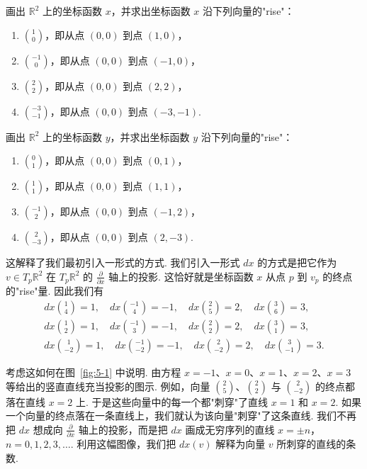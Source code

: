 \begin{question}\label{q:5-1}
画出 $\mathbb{R}^2$ 上的坐标函数 $x$，并求出坐标函数 $x$ 沿下列向量的"rise"：
\begin{enumerate}
  \item[(a)] $\binom{1}{0}$，即从点 $(0,0)$ 到点 $(1,0)$，
  \item[(b)] $\binom{-1}{0}$，即从点 $(0,0)$ 到点 $(-1,0)$，
  \item[(c)] $\binom{2}{2}$，即从点 $(0,0)$ 到点 $(2,2)$，
  \item[(d)] $\binom{-3}{-1}$，即从点 $(0,0)$ 到点 $(-3,-1)$.
\end{enumerate}
\end{question}

\begin{question}\label{q:5-2}
画出 $\mathbb{R}^2$ 上的坐标函数 $y$，并求出坐标函数 $y$ 沿下列向量的"rise"：
\begin{enumerate}
  \item[(a)] $\binom{0}{1}$，即从点 $(0,0)$ 到点 $(0,1)$，
  \item[(b)] $\binom{1}{1}$，即从点 $(0,0)$ 到点 $(1,1)$，
  \item[(c)] $\binom{-1}{2}$，即从点 $(0,0)$ 到点 $(-1,2)$，
  \item[(d)] $\binom{2}{-3}$，即从点 $(0,0)$ 到点 $(2,-3)$.
\end{enumerate}
\end{question}

这解释了我们最初引入一形式的方式. 我们引入一形式 $dx$ 的方式是把它作为 $v\in T_p\mathbb{R}^2$ 在 $T_p\mathbb{R}^2$ 的 $\frac{\partial}{\partial x}$ 轴上的投影. 这恰好就是坐标函数 $x$ 从点 $p$ 到 $v_p$ 的终点的"rise"量. 因此我们有
\begin{align*}
dx\binom{1}{4}=1,\quad dx\binom{-1}{4}=-1,\quad dx\binom{2}{5}=2,\quad dx\binom{3}{6}=3, \\
dx\binom{1}{2}=1,\quad dx\binom{-1}{3}=-1,\quad dx\binom{2}{2}=2,\quad dx\binom{3}{1}=3, \\
dx\binom{1}{-2}=1,\quad dx\binom{-1}{-2}=-1,\quad dx\binom{2}{-2}=2,\quad dx\binom{3}{-1}=3.
\end{align*}

考虑这如何在图~\ref{fig:5-1} 中说明. 由方程 $x=-1$、$x=0$、$x=1$、$x=2$、$x=3$ 等给出的竖直直线充当投影的图示. 例如，向量 $\binom{2}{5}$、$\binom{2}{2}$ 与 $\binom{2}{-2}$ 的终点都落在直线 $x=2$ 上. 于是这些向量中的每一个都"刺穿"了直线 $x=1$ 和 $x=2$. 如果一个向量的终点落在一条直线上，我们就认为该向量"刺穿"了这条直线. 我们不再把 $dx$ 想成向 $\frac{\partial}{\partial x}$ 轴上的投影，而是把 $dx$ 画成无穷序列的直线 $x=\pm n$，$n=0,1,2,3,\ldots$. 利用这幅图像，我们把 $dx(v)$ 解释为向量 $v$ 所刺穿的直线的条数.

